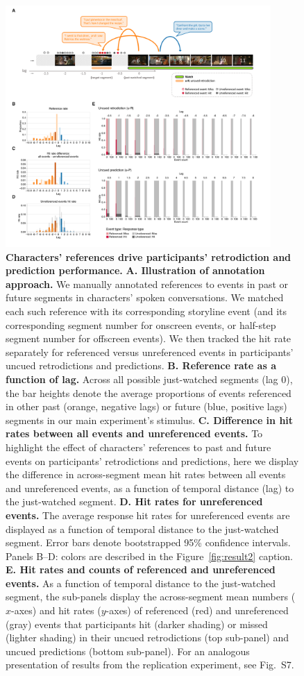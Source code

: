 \documentclass[10pt]{article}
\newcommand{\characterRefs}{S7}
\begin{document}
\begin{figure}[tp]
  \centering
  \includegraphics[width=0.9\textwidth]{results3}

  \caption{\textbf{Characters' references drive participants' retrodiction and
  prediction performance.} \textbf{A. Illustration of annotation approach.} We
  manually annotated references to events in past or future segments in
  characters' spoken conversations. We matched each such reference with its
  corresponding storyline event (and its corresponding segment number for
  onscreen events, or half-step segment number for offscreen events). We then
  tracked the hit rate separately for referenced versus unreferenced events in
  participants' uncued retrodictions and predictions. \textbf{B. Reference rate
  as a function of lag.} Across all possible just-watched segments (lag 0), the
  bar heights denote the average proportions of events referenced in other past
  (orange, negative lags) or future (blue, positive lags) segments in our main
  experiment's stimulus. \textbf{C. Difference in hit rates between all events
  and unreferenced events.} To highlight the effect of characters' references
  to past and future events on participants' retrodictions and predictions,
  here we display the difference in across-segment mean hit rates between all
  events and unreferenced events, as a function of temporal distance (lag) to
  the just-watched segment. \textbf{D. Hit rates for unreferenced events.} The
  average response hit rates for unreferenced events are displayed as a
  function of temporal distance to the just-watched segment. Error bars denote
  bootstrapped 95\% confidence intervals. Panels B--D: colors are described in
  the Figure~\ref{fig:result2} caption. \textbf{E. Hit rates and counts of
  referenced and unreferenced events.} As a function of temporal distance to
  the just-watched segment, the sub-panels display the across-segment mean
  numbers ($x$-axes) and hit rates ($y$-axes) of referenced (red) and
  unreferenced (gray) events that participants hit (darker shading) or missed
  (lighter shading) in their uncued retrodictions (top sub-panel) and uncued
  predictions (bottom sub-panel). For an analogous presentation of results from
  the replication experiment, see Fig.~\characterRefs.}


\end{figure}
\end{document}
